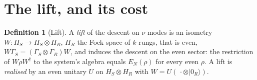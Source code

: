 \documentclass[11pt]{article}
\theoremstyle{definition}
\newtheorem{definition}[theorem]{Definition}
\theoremstyle{plain}
\providecommand{\EN}{}\renewcommand{\EN}{E_{N}}
\providecommand{\G}{}\renewcommand{\G}{\Gamma}
\providecommand{\ket}{}\renewcommand{\ket}[1]{|#1\rangle}
\begin{document}
\section{The lift, and its cost}

\begin{definition}[Lift]\label{c:obj.descent-lift.lift}
A \emph{lift} of the descent on $\nu$ modes is an isometry $W : H_{S} \to H_{S} \otimes H_{R}$, $H_{R}$ the Fock space of $k$ rungs, that is even, $W\G_{S} = (\G_{S}\otimes\G_{R})W$, and induces the descent on the even sector: the restriction of $W\rho W^{\dagger}$ to the system's algebra equals $\EN(\rho)$ for every even $\rho$. A lift is \emph{realised} by an even unitary $U$ on $H_{S}\otimes H_{R}$ with $W = U(\,\cdot \otimes \ket{0_{R}})$.
\end{definition}
\end{document}

